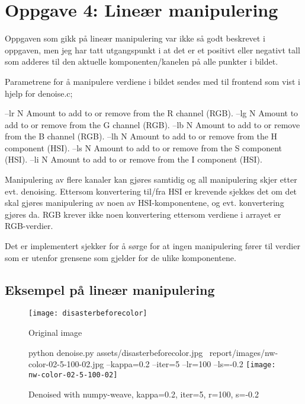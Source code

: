 \section*{Oppgave 4: Lineær manipulering}

Oppgaven som gikk på lineær manipulering var ikke så godt beskrevet i oppgaven, men jeg har tatt utgangspunkt i at det er et positivt eller negativt tall som adderes til den aktuelle komponenten/kanelen på alle punkter i bildet.

Parametrene for å manipulere verdiene i bildet sendes med til frontend som vist i hjelp for denoise.c;

--lr N  Amount to add to or remove from the R channel (RGB).
--lg N  Amount to add to or remove from the G channel (RGB).
--lb N  Amount to add to or remove from the B channel (RGB).
--lh N  Amount to add to or remove from the H component (HSI).
--ls N  Amount to add to or remove from the S component (HSI).
--li N  Amount to add to or remove from the I component (HSI).

Manipulering av flere kanaler kan gjøres samtidig og all manipulering skjer etter evt. denoising. Ettersom konvertering til/fra HSI er krevende sjekkes det om det skal gjøres manipulering av noen av HSI-komponentene, og evt. konvertering gjøres da. RGB krever ikke noen konvertering ettersom verdiene i arrayet er RGB-verdier.

Det er implementert sjekker for å sørge for at ingen manipulering fører til verdier som er utenfor grensene som gjelder for de ulike komponentene.

\subsection*{Eksempel på lineær manipulering}
\begin{figure}[!h]
\centering
\texttt{[image: disasterbeforecolor]}
\caption{Original image}
\end{figure}

\pagebreak

\begin{figure}[!h]
\centering
python denoise.py assets/disasterbeforecolor.jpg \
report/images/nw-color-02-5-100-02.jpg --kappa=0.2 --iter=5 --lr=100 --ls=-0.2
\texttt{[image: nw-color-02-5-100-02]}
\caption{Denoised with numpy-weave, kappa=0.2, iter=5, r=100, s=-0.2}
\end{figure}

\pagebreak